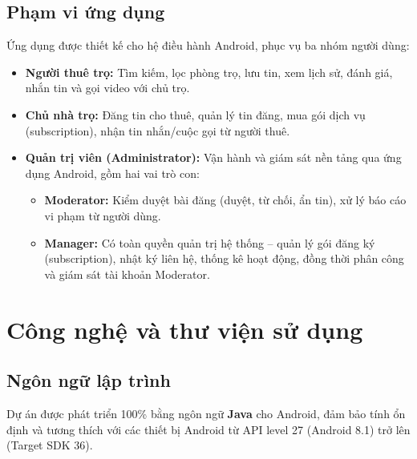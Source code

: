 \subsection{Phạm vi ứng dụng}
Ứng dụng được thiết kế cho hệ điều hành Android, phục vụ ba nhóm người dùng:
\begin{itemize}
    \item \textbf{Người thuê trọ:} Tìm kiếm, lọc phòng trọ, lưu tin, xem lịch sử, đánh giá, nhắn tin và gọi video với chủ trọ.
    \item \textbf{Chủ nhà trọ:} Đăng tin cho thuê, quản lý tin đăng, mua gói dịch vụ (subscription), nhận tin nhắn/cuộc gọi từ người thuê.
    \item \textbf{Quản trị viên (Administrator):} Vận hành và giám sát nền tảng qua ứng dụng Android, gồm hai vai trò con:
    \begin{itemize}
        \item \textbf{Moderator:} Kiểm duyệt bài đăng (duyệt, từ chối, ẩn tin), xử lý báo cáo vi phạm từ người dùng.
        \item \textbf{Manager:} Có toàn quyền quản trị hệ thống -- quản lý gói đăng ký (subscription), nhật ký liên hệ, thống kê hoạt động, đồng thời phân công và giám sát tài khoản Moderator.
    \end{itemize}
\end{itemize}

\section{Công nghệ và thư viện sử dụng}

\subsection{Ngôn ngữ lập trình}
Dự án được phát triển 100\% bằng ngôn ngữ \textbf{Java} cho Android, đảm bảo tính ổn định và tương thích với các thiết bị Android từ API level 27 (Android 8.1) trở lên (Target SDK 36).

